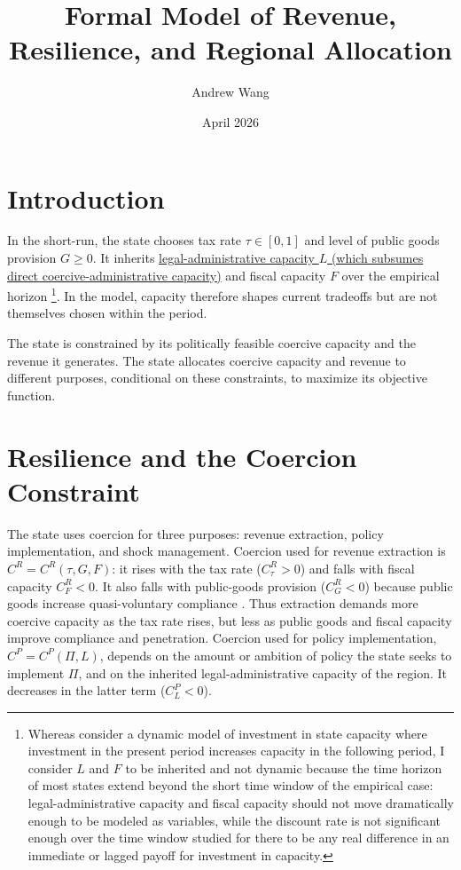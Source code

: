 \documentclass[12pt]{article}
\title{Formal Model of Revenue, Resilience, and Regional Allocation}
\author{Andrew Wang}
\date{April 2026}
\begin{document}
\maketitle

\section*{Introduction}

In the short-run, the state chooses tax rate $\tau \in [0,1]$ and level of public goods provision $G \ge 0$. It inherits \underline{legal-administrative capacity $L$ (which subsumes direct coercive-administrative capacity)} and fiscal capacity $F$ over the empirical horizon \footnote{Whereas \cite{besleyOriginsStateCapacity2009} consider a dynamic model of investment in state capacity where investment in the present period increases capacity in the following period, I consider $L$ and $F$ to be inherited and not dynamic because the time horizon of most states extend beyond the short time window of the empirical case: legal-administrative capacity and fiscal capacity should not move dramatically enough to be modeled as variables, while the discount rate is not significant enough over the time window studied for there to be any real difference in an immediate or lagged payoff for investment in capacity.}. In the model, capacity therefore shapes current tradeoffs but are not themselves chosen within the period.

The state is constrained by its politically feasible coercive capacity and the revenue it generates. The state allocates coercive capacity and revenue to different purposes, conditional on these constraints, to maximize its objective function.

\section* {Resilience and the Coercion Constraint}

The state uses coercion for three purposes: revenue extraction, policy implementation, and shock management. Coercion used for revenue extraction is $C^R = C^R(\tau,G,F)$: it rises with the tax rate ($C^R_{\tau} > 0$) and falls with fiscal capacity $C^R_F < 0$. It also falls with public-goods provision ($C^R_G < 0$) because public goods increase quasi-voluntary compliance \cite{levi1988}. Thus extraction demands more coercive capacity as the tax rate rises, but less as public goods and fiscal capacity improve compliance and penetration. Coercion used for policy implementation, $C^P = C^P(\Pi,L)$, depends on the amount or ambition of policy the state seeks to implement $\Pi$, and on the inherited legal-administrative capacity of the region. It decreases in the latter term ($C^P_L < 0$).
\end{document}

